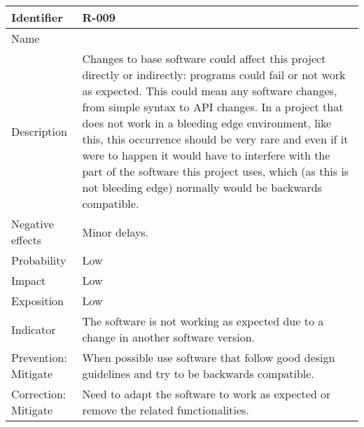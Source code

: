 \begin{table}[H]
	\begin{tabularx}{\textwidth}{|y|z|}
		\hline
		Identifier & \textbf{R-009} \\ \hline
		Name & \Rnueve \\ \hline
		Description &
			Changes to base software could affect this project directly or indirectly: programs could fail or not work as expected. \linej
			This could mean any software changes, from simple syntax to API changes. \linej
			In a project that does not work in a bleeding edge environment, like this, this occurrence should be very rare and even if it were to happen it would have to interfere with the part of the software this project uses, which (as this is not bleeding edge) normally would be backwards compatible.
		\\ \hline
		Negative effects &
			Minor delays.
		\\ \hline
		Probability & Low\\ \hline
		Impact & Low \\ \hline
		Exposition &  Low\\ \hline
		Indicator & The software is not working as expected due to a change in another software version.\\ \hline
		Prevention: Mitigate &
			When possible use software that follow good design guidelines and try to be backwards compatible.
		\\ \hline
		Correction: Mitigate &
			Need to adapt the software to work as expected or remove the related functionalities.
		\\ \hline
	\end{tabularx}
\end{table}

